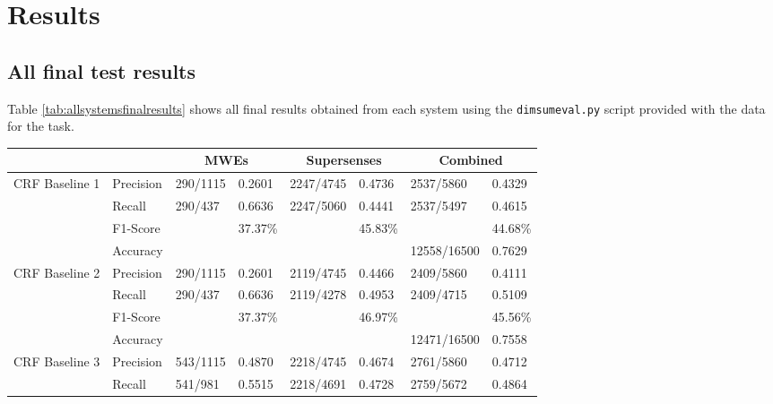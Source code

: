 \section{Results}\label{appendixresults}

\subsection{All final test results}

Table \ref{tab:allsystemsfinalresults} shows all final results obtained from each system using the \texttt{dimsumeval.py} script provided with the data for the \dimsum task. 

\begin{table}[H]
  \small
  \centering
  \begin{tabular}{|l|lllllll|}
    \multicolumn{2}{c}{} & \multicolumn{2}{c}{MWEs} & \multicolumn{2}{c}{Supersenses} & \multicolumn{2}{c}{Combined}\\  
    \hline
    \multirow{4}{*}{CRF Baseline 1} & Precision & 290/1115 & 0.2601  & 2247/4745 & 0.4736  & 2537/5860   & 0.4329 \\
                                    & Recall    & 290/437  & 0.6636  & 2247/5060 & 0.4441  & 2537/5497   & 0.4615 \\
                                    & F1-Score  &          & 37.37\% &           & 45.83\% &             & 44.68\%\\
                                    & Accuracy  &          &         &           &         & 12558/16500 & 0.7629 \\
    \hline
    \multirow{4}{*}{CRF Baseline 2} & Precision & 290/1115 & 0.2601  & 2119/4745 & 0.4466  & 2409/5860   & 0.4111 \\
                                    & Recall    & 290/437  & 0.6636  & 2119/4278 & 0.4953  & 2409/4715   & 0.5109 \\
                                    & F1-Score  &          & 37.37\% &           & 46.97\% &             & 45.56\%\\
                                    & Accuracy  &          &         &           &         & 12471/16500 & 0.7558 \\
    \hline
    \multirow{4}{*}{CRF Baseline 3} & Precision & 543/1115 & 0.4870  & 2218/4745 & 0.4674  & 2761/5860   & 0.4712 \\
                                    & Recall    & 541/981  & 0.5515  & 2218/4691 & 0.4728  & 2759/5672   & 0.4864 \\

\end{tabular}
\end{table}
